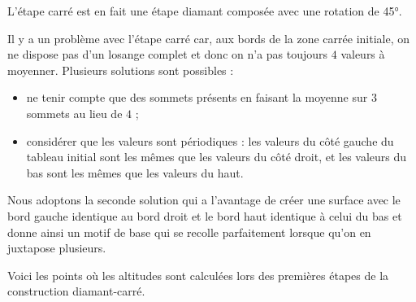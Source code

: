 \documentclass[11pt,class=report,crop=false]{standalone}
\begin{document}
L'étape carré est en fait une étape diamant composée avec une rotation de \ang{45}.

Il y a un problème avec l'étape carré car, aux bords de la zone carrée initiale, on ne dispose pas d'un losange complet et donc on n'a pas toujours $4$ valeurs à moyenner. Plusieurs solutions sont possibles :
\begin{itemize}
  \item ne tenir compte que des sommets présents en faisant la moyenne sur $3$ sommets au lieu de $4$ ;
  \item considérer que les valeurs sont périodiques : les valeurs du côté gauche du tableau initial sont les mêmes que les valeurs du côté droit, et les valeurs du bas sont les mêmes que les valeurs du haut.
\end{itemize}


Nous adoptons la seconde solution qui a l'avantage de créer une surface avec le bord gauche identique au bord droit et le bord haut identique à celui du bas et donne ainsi un motif de base qui se recolle parfaitement lorsque qu'on en juxtapose plusieurs.


Voici les points où les altitudes sont calculées lors des premières étapes de la construction \og{}diamant-carré\fg{}.


\end{document}
